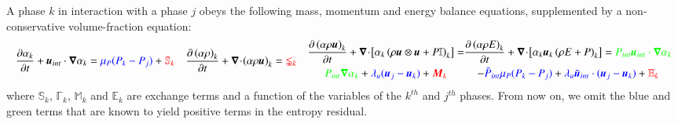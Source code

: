 \documentclass[preprint,10pt]{elsarticle}
\renewcommand{\div}{\mbold{\nabla}\! \cdot \!}
\newcommand{\grad}{\mbold{\nabla}}
\newcommand{\mbold}[1]{\boldsymbol#1}
\newcommand{\tcr}[1]{\textcolor{red}{#1}}
\newcommand{\tcb}[1]{\textcolor{blue}{#1}}
\newcommand{\tcg}[1]{\textcolor{green}{#1}}
\begin{document}
A phase $k$ in interaction with a phase $j$ obeys the following mass, momentum and energy balance equations, supplemented by a non-conservative volume-fraction equation:
%
\begin{subequations}\label{eq:liq-7-eqn-sect5}
\begin{align}
  \label{eqn:multi-d-7-eqn-liq-vol}
  \frac{\partial \alpha_{k} }{\partial t} + \mbold u_{int} \cdot \grad \alpha_k 
  &= \tcb{\mu_P (P_k - P_j)} + \tcr{\mathbb{S}_k}
\end{align}
\begin{align}
  \label{multi-d-7-equ-liq}
  \frac{\partial \left( \alpha \rho \right)_k }{\partial t}
  + \div \left( \alpha \rho \mbold u \right)_k
  &= \tcr{\mathbb{\Gamma}_k}
\end{align}
\begin{multline}
  \frac{\partial \left( \alpha \rho \mbold u \right)_k }{\partial t}
  + \div \left[ \alpha_k  \left( \rho \mbold u \otimes \mbold u + P \mathbb{I} \right)_k \right] =
  \\
   \tcg{P_{int} \grad \alpha_k}
  + \tcb{\lambda_u (\mbold u_j - \mbold u_k)} + \tcr{\mathbb{\mbold M}_k}
\end{multline}
\begin{multline}
  \frac{\partial \left( \alpha \rho E \right)_k }{\partial t}
  + \div \left[ \alpha_k \mbold u_k  \left( \rho E + P \right)_k \right]
  = \tcg{P_{int} \mbold u_{int} \cdot  \grad \alpha_k }
  \\
  - \tcb{\bar{P}_{int} \mu_P (P_k - P_j)}
  + \tcb{\lambda_u \bar{\mbold u}_{int} \cdot (\mbold u_j - \mbold u_k)} + \tcr{\mathbb{E}_k }
\end{multline}
\end{subequations}
%
where $\mathbb{S}_k$, $\mathbb{\Gamma}_k$, $\mathbb{M}_k$ and $\mathbb{E}_k$ are exchange terms and a function of the variables of the $k^{th}$ and $j^{th}$ phases. From now on, we omit the blue and green terms that are known to yield positive terms in the entropy residual.
\end{document}
